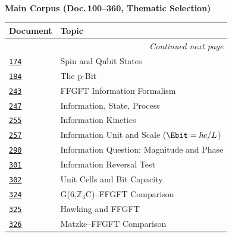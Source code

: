 \vspace{0.5em}
\noindent\textbf{Main Corpus (Doc.\,100–360, Thematic Selection)}

\vspace{0.3em}
{\scriptsize
\setlength{\LTleft}{0pt}
\setlength{\LTright}{0pt}
\begin{longtable}{@{}p{}p{}@{}}
\toprule
\textbf{Document} & \textbf{Topic} \\
\midrule
\endhead
\midrule
\multicolumn{2}{r}{\scriptsize\itshape Continued next page} \\
\endfoot
\bottomrule
\endlastfoot
\href{https://github.com/jpascher/T0-Time-Mass-Duality/blob/main/2/pdf/174_T0_Spin_Qubit_Zustaende_De.pdf}{\texttt{174}} &
  Spin and Qubit States \\
\href{https://github.com/jpascher/T0-Time-Mass-Duality/blob/main/2/pdf/184_p-bit_De.pdf}{\texttt{184}} &
  The p-Bit \\
\href{https://github.com/jpascher/T0-Time-Mass-Duality/blob/main/2/pdf/243_FFGFT_Informationsformalismus_De.pdf}{\texttt{243}} &
  FFGFT Information Formalism \\
\href{https://github.com/jpascher/T0-Time-Mass-Duality/blob/main/2/pdf/247_Information_State_Process_De.pdf}{\texttt{247}} &
  Information, State, Process \\
\href{https://github.com/jpascher/T0-Time-Mass-Duality/blob/main/2/pdf/255_Information_Kinetik_De.pdf}{\texttt{255}} &
  Information Kinetics \\
\href{https://github.com/jpascher/T0-Time-Mass-Duality/blob/main/2/pdf/257_Informationseinheit_Skala_De.pdf}{\texttt{257}} &
  Information Unit and Scale ($\Ebit = \hbar c/L$) \\
\href{https://github.com/jpascher/T0-Time-Mass-Duality/blob/main/2/pdf/290_Informationsfrage_Betrag_Phase_De.pdf}{\texttt{290}} &
  Information Question: Magnitude and Phase \\
\href{https://github.com/jpascher/T0-Time-Mass-Duality/blob/main/2/pdf/301_Information_Umkehrtest_De.pdf}{\texttt{301}} &
  Information Reversal Test \\
\href{https://github.com/jpascher/T0-Time-Mass-Duality/blob/main/2/pdf/302_Elementarzellen_Spektrale_Antwort_De.pdf}{\texttt{302}} &
  Unit Cells and Bit Capacity \\
\href{https://github.com/jpascher/T0-Time-Mass-Duality/blob/main/2/pdf/324_G6_Z3C_FFGFT_Vergleich_De.pdf}{\texttt{324}} &
  G(6,$\mathbb{Z}_3$C)--FFGFT Comparison \\
\href{https://github.com/jpascher/T0-Time-Mass-Duality/blob/main/2/pdf/325_Hawking_FFGFT_De.pdf}{\texttt{325}} &
  Hawking and FFGFT \\
\href{https://github.com/jpascher/T0-Time-Mass-Duality/blob/main/2/pdf/326_Matzke_FFGFT_Vergleich_De.pdf}{\texttt{326}} &
  Matzke--FFGFT Comparison \\
\end{longtable}
}